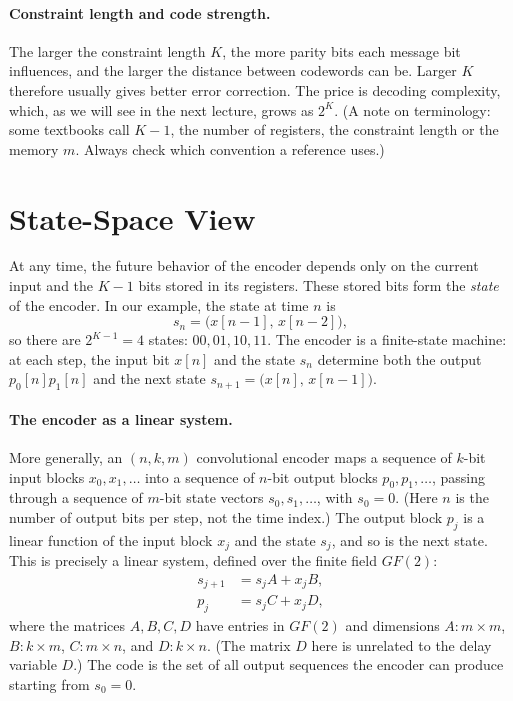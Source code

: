 \paragraph{Constraint length and code strength.} The larger the constraint length \(K\), the more parity bits each message bit influences, and the larger the distance between codewords can be. Larger \(K\) therefore usually gives better error correction. The price is decoding complexity, which, as we will see in the next lecture, grows as \(2^{K}\). (A note on terminology: some textbooks call \(K-1\), the number of registers, the constraint length or the memory \(m\). Always check which convention a reference uses.)

\section{State-Space View}
At any time, the future behavior of the encoder depends only on the current input and the \(K-1\) bits stored in its registers. These stored bits form the \emph{state} of the encoder. In our example, the state at time \(n\) is
\[s_n = \big(x[n-1],\, x[n-2]\big),\]
so there are \(2^{K-1} = 4\) states: \(00, 01, 10, 11\). The encoder is a finite-state machine: at each step, the input bit \(x[n]\) and the state \(s_n\) determine both the output \(p_0[n]p_1[n]\) and the next state \(s_{n+1} = \big(x[n],\, x[n-1]\big)\).

\paragraph{The encoder as a linear system.} More generally, an \((n, k, m)\) convolutional encoder maps a sequence of \(k\)-bit input blocks \(x_0, x_1, \ldots\) into a sequence of \(n\)-bit output blocks \(p_0, p_1, \ldots\), passing through a sequence of \(m\)-bit state vectors \(s_0, s_1, \ldots\), with \(s_0 = 0\). (Here \(n\) is the number of output bits per step, not the time index.) The output block \(p_j\) is a linear function of the input block \(x_j\) and the state \(s_j\), and so is the next state. This is precisely a linear system, defined over the finite field \(GF(2)\):
\begin{align}
 s_{j+1} &= s_j A + x_j B,  \label{eq:state} \\
 p_j &= s_j C + x_j D, \label{eq:output}
\end{align}
where the matrices \(A, B, C, D\) have entries in \(GF(2)\) and dimensions \(A: m \times m\), \(B: k \times m\), \(C: m \times n\), and \(D: k \times n\). (The matrix \(D\) here is unrelated to the delay variable \(D\).) The code is the set of all output sequences the encoder can produce starting from \(s_0 = 0\).


